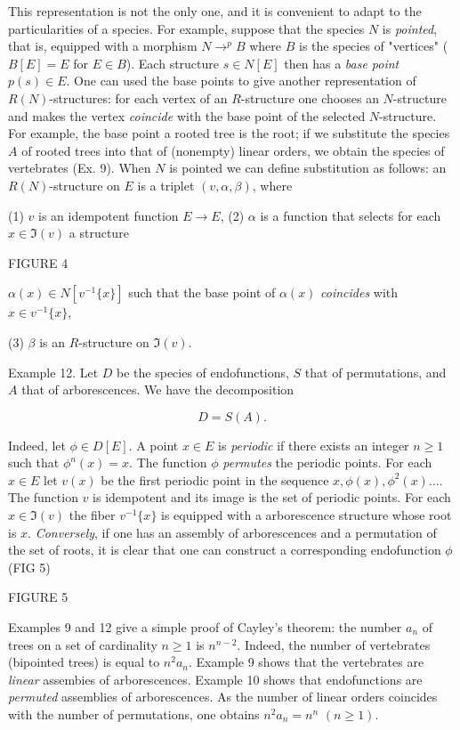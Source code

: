 \documentclass{article}
\theoremstyle{definition}
\theoremstyle{remark}
\newcommand{\term}[1]{\emph{#1}}
\begin{document}
This representation is not the only one, and it is convenient to adapt to
the particularities of a species. For example, suppose that the species $N$
is \emph{pointed}, that is, equipped with a morphism $N \to^p B$ where $B$ is the species
of "vertices" ($B [E] = E$ for $E \in B$). Each structure $s \in N[E]$ then has
a \emph{base point} $p (s) \in E$. One can used the base points to
give another representation of $R (N)$-structures: for each vertex
of an $R$-structure one chooses an $N$-structure and makes the vertex \emph{coincide}
with the base point of the selected $N$-structure. For example, the base point
a rooted tree is the root; if we substitute the species $A$ of rooted trees
into that of (nonempty) linear orders, we obtain the species of vertebrates
(Ex. 9). When $N$ is pointed we can define substitution as follows: an
$R (N)$-structure on $E$ is a triplet $(v, \alpha, \beta)$, where

(1) $v$ is an idempotent function $E \to E$,
(2) $\alpha$ is a function that selects for each $x \in \Im (v)$ a structure



FIGURE 4

$\alpha (x) \in N [v^{-1}\{x\}]$ such that the base point of $\alpha (x)$ \emph{coincides} with $x \in v^{-1}\{x\}$,

(3) $\beta$ is an $R$-structure on $\Im (v)$.

Example 12. Let $D$ be the species of endofunctions, $S$ that of
permutations, and $A$ that of arborescences. We have the decomposition

\[ D = S(A). \]

Indeed, let $\phi \in D [E]$. A point $x \in E$ is \term{periodic} if there exists an integer
$n \geq 1$ such that $\phi^n(x) = x$. The function $\phi$ \term{permutes} the periodic points.
For each $x \in E$ let $v (x)$ be the first periodic point in the
sequence $x, \phi(x), \phi^2(x) \dots$. The function $v$ is idempotent and its image is the set
of periodic points. For each $x \in \Im (v)$ the fiber $v^{-1}\{x\}$ is
equipped with a arborescence structure whose root is $x$. \emph{Conversely}, if
one has an assembly of arborescences and a permutation of the set of roots,
it is clear that one can construct a corresponding endofunction
$\phi$ (FIG 5)







FIGURE 5

Examples 9 and 12 give a simple proof of Cayley's theorem: the number
$a_n$ of trees on a set of cardinality $n \geq 1$ is
$n^{n-2}$. Indeed, the number of vertebrates (bipointed trees) is
equal to $n^2a_n$.  Example 9 shows that the vertebrates are
\emph{linear} assembies of arborescences.  Example 10 shows that
endofunctions are \emph{permuted} assemblies of arborescences.  As the
number of linear orders coincides with the number of permutations, one
obtains $n^2 a_n = n^n$ $(n \geq 1)$.
\end{document}
